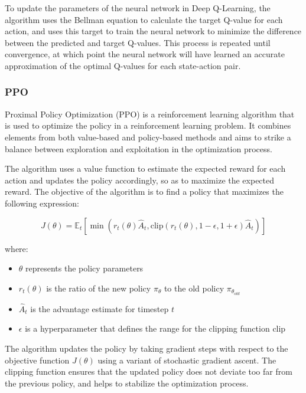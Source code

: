 \documentclass[
  12pt,
  a4paper,
  DIV=11,
  numbers=noendperiod]{scrartcl}
\providecommand{\tightlist}{%
  \setlength{\itemsep}{0pt}\setlength{\parskip}{0pt}}\usepackage{longtable,booktabs,array}
\begin{document}
To update the parameters of the neural network in Deep Q-Learning, the
algorithm uses the Bellman equation to calculate the target Q-value for
each action, and uses this target to train the neural network to
minimize the difference between the predicted and target Q-values. This
process is repeated until convergence, at which point the neural network
will have learned an accurate approximation of the optimal Q-values for
each state-action pair.

\hypertarget{ppo}{%
\subsubsection{PPO}\label{ppo}}

Proximal Policy Optimization (PPO) is a reinforcement learning algorithm
that is used to optimize the policy in a reinforcement learning problem.
It combines elements from both value-based and policy-based methods and
aims to strike a balance between exploration and exploitation in the
optimization process.

The algorithm uses a value function to estimate the expected reward for
each action and updates the policy accordingly, so as to maximize the
expected reward. The objective of the algorithm is to find a policy that
maximizes the following expression:

\[
J(\theta) = \mathbb{E}_{t}\left[\min\left(r_t(\theta)\hat{A}_t,\text{clip}(r_t(\theta),1-\epsilon,1+\epsilon)\hat{A}_t\right)\right]
\]

where:

\begin{itemize}
\tightlist
\item
  \(\theta\) represents the policy parameters
\item
  \(r_t(\theta)\) is the ratio of the new policy \(\pi_{\theta}\) to the
  old policy \(\pi_{\theta_{old}}\)
\item
  \(\hat{A}_t\) is the advantage estimate for timestep \(t\)
\item
  \(\epsilon\) is a hyperparameter that defines the range for the
  clipping function \(\text{clip}\)
\end{itemize}

The algorithm updates the policy by taking gradient steps with respect
to the objective function \(J(\theta)\) using a variant of stochastic
gradient ascent. The clipping function ensures that the updated policy
does not deviate too far from the previous policy, and helps to
stabilize the optimization process.
\end{document}
